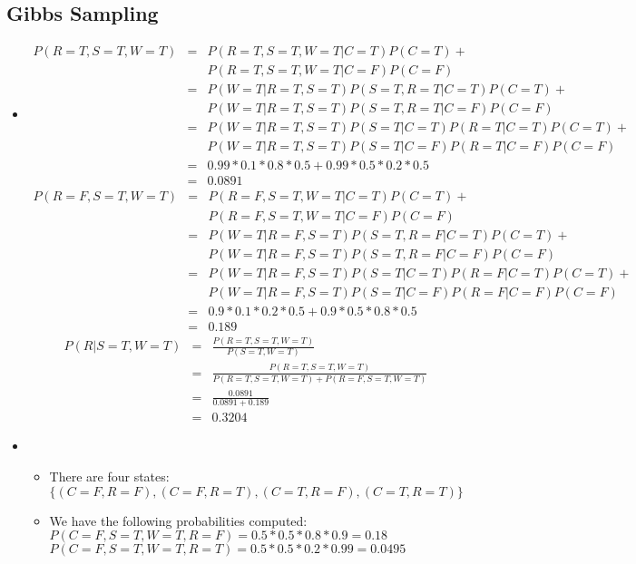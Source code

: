 \documentclass[11pt]{article}
\begin{document}
\begin{onehalfspace}
\section{Gibbs Sampling}
\begin{itemize}
	\item
	\begin{eqnarray*}
	  P(R=T,S=T,W=T) &=& P(R=T,S=T,W=T|C=T)P(C=T)+\\
	  &&P(R=T,S=T,W=T|C=F)P(C=F)\\
	  &=& P(W=T|R=T,S=T)P(S=T,R=T|C=T)P(C=T)+\\
	  &&P(W=T|R=T,S=T)P(S=T,R=T|C=F)P(C=F)\\
	  &=& P(W=T|R=T,S=T)P(S=T|C=T)P(R=T|C=T)P(C=T)+\\
	  &&P(W=T|R=T,S=T)P(S=T|C=F)P(R=T|C=F)P(C=F)\\
	  &=& 0.99*0.1*0.8*0.5+0.99*0.5*0.2*0.5\\
	  &=& 0.0891
	\end{eqnarray*}
	\begin{eqnarray*}
	  P(R=F,S=T,W=T) &=& P(R=F,S=T,W=T|C=T)P(C=T)+\\
	  &&P(R=F,S=T,W=T|C=F)P(C=F)\\
	  &=& P(W=T|R=F,S=T)P(S=T,R=F|C=T)P(C=T)+\\
	  &&P(W=T|R=F,S=T)P(S=T,R=F|C=F)P(C=F)\\
	  &=& P(W=T|R=F,S=T)P(S=T|C=T)P(R=F|C=T)P(C=T)+\\
	  &&P(W=T|R=F,S=T)P(S=T|C=F)P(R=F|C=F)P(C=F)\\
	  &=& 0.9*0.1*0.2*0.5+0.9*0.5*0.8*0.5\\
	  &=& 0.189
	\end{eqnarray*}
	\begin{eqnarray*}
	  P(R|S=T,W=T) &=& \frac{P(R=T,S=T,W=T)}{P(S=T,W=T)}\\
	  &=& \frac{P(R=T,S=T,W=T)}{P(R=T,S=T,W=T)+P(R=F,S=T,W=T)}\\
	  &=& \frac{0.0891}{0.0891+0.189}\\
	  &=& 0.3204
	\end{eqnarray*}
	\item
	\begin{itemize}
	  \item
	  There are four states: $\{(C=F,R=F),(C=F,R=T),(C=T,R=F),(C=T,R=T)\}$
	  \item
	  We have the following probabilities computed:\\
	  $P(C=F,S=T,W=T,R=F)=0.5*0.5*0.8*0.9=0.18$\\
	  $P(C=F,S=T,W=T,R=T)=0.5*0.5*0.2*0.99=0.0495$\\

\end{itemize}
\end{itemize}
\end{onehalfspace}
\end{document}
